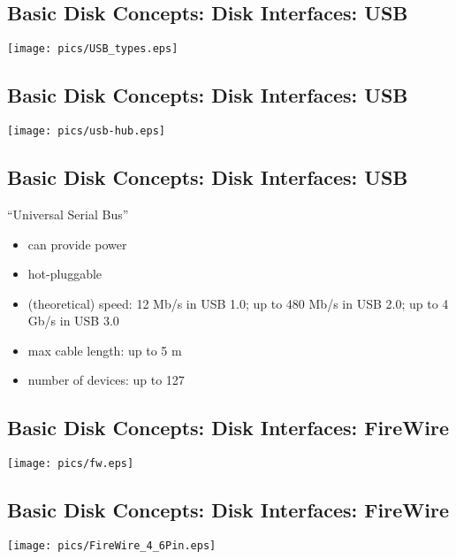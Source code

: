\documentclass[xga]{xdvislides}
\begin{document}
\subsection{Basic Disk Concepts: Disk Interfaces: USB}
\vfill
	\begin{center}
		\texttt{[image: pics/USB\_types.eps]} \\
	\end{center}
\vfill

\subsection{Basic Disk Concepts: Disk Interfaces: USB}
\vfill
	\begin{center}
		\texttt{[image: pics/usb-hub.eps]} \\
	\end{center}
\vfill

\subsection{Basic Disk Concepts: Disk Interfaces: USB}
``Universal Serial Bus''
\begin{itemize}
	\item can provide power
	\item hot-pluggable
	\item (theoretical) speed: 12 Mb/s in USB 1.0; up to 480 Mb/s in USB 2.0; up to 4 Gb/s in USB 3.0
	\item max cable length: up to 5 m
	\item number of devices: up to 127
\end{itemize}



\subsection{Basic Disk Concepts: Disk Interfaces: FireWire}
\vfill
	\begin{center}
		\texttt{[image: pics/fw.eps]} \\
	\end{center}
\vfill


\subsection{Basic Disk Concepts: Disk Interfaces: FireWire}
\vfill
	\begin{center}
		\texttt{[image: pics/FireWire\_4\_6Pin.eps]} \\
	\end{center}
\vfill
\end{document}

